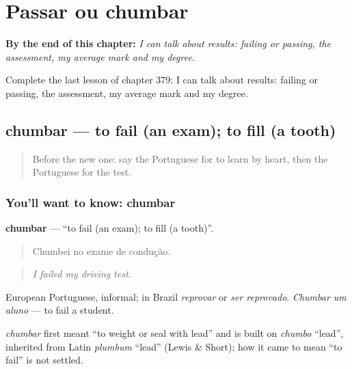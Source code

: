 
\chapter{Passar ou chumbar}
\label{ch:pt-passar-ou-chumbar}

\begin{chapteropening}
\textbf{By the end of this chapter:} \emph{I can talk about results: failing or passing, the assessment, my average mark and my degree.}

Complete the last lesson of chapter 379: I can talk about results: failing or passing, the assessment, my average mark and my degree.
\end{chapteropening}

\section[chumbar]{chumbar — to fail (an exam); to fill (a tooth)}

\label{lesson:PT-C379-chumbar}



\begin{quote}
Before the new one: say the Portuguese for to learn by heart, then the Portuguese for the test.
\end{quote}

\subsection*{You'll want to know: chumbar}
\textbf{chumbar} — \textquotedblleft{}to fail (an exam); to fill (a tooth)\textquotedblright{}.

\begin{quote}
Chumbei no exame de condução.
\end{quote}

\begin{quote}
\emph{I failed my driving test.}
\end{quote}

European Portuguese, informal; in Brazil \emph{reprovar} or \emph{ser reprovado}. \emph{Chumbar um aluno} — to fail a student.

\begin{cousinweb}
\emph{chumbar} first meant \textquotedblleft{}to weight or seal with lead\textquotedblright{} and is built on \emph{chumbo} \textquotedblleft{}lead\textquotedblright{}, inherited from Latin \emph{plumbum} \textquotedblleft{}lead\textquotedblright{} (Lewis \& Short); how it came to mean \textquotedblleft{}to fail\textquotedblright{} is not settled.
\end{cousinweb}

